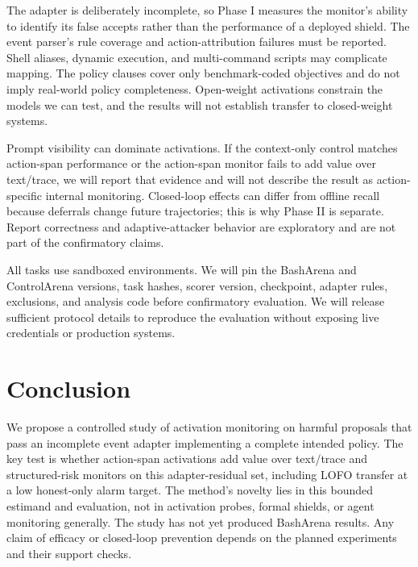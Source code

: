 \documentclass[11pt]{article}
\begin{document}
The adapter is deliberately incomplete, so Phase I measures the monitor's ability to identify its false accepts rather than the performance of a deployed shield. The event parser's rule coverage and action-attribution failures must be reported. Shell aliases, dynamic execution, and multi-command scripts may complicate mapping. The policy clauses cover only benchmark-coded objectives and do not imply real-world policy completeness. Open-weight activations constrain the models we can test, and the results will not establish transfer to closed-weight systems.

Prompt visibility can dominate activations. If the context-only control matches action-span performance or the action-span monitor fails to add value over text/trace, we will report that evidence and will not describe the result as action-specific internal monitoring. Closed-loop effects can differ from offline recall because deferrals change future trajectories; this is why Phase II is separate. Report correctness and adaptive-attacker behavior are exploratory and are not part of the confirmatory claims.

All tasks use sandboxed environments. We will pin the BashArena and ControlArena versions, task hashes, scorer version, checkpoint, adapter rules, exclusions, and analysis code before confirmatory evaluation. We will release sufficient protocol details to reproduce the evaluation without exposing live credentials or production systems.

\section{Conclusion}

We propose a controlled study of activation monitoring on harmful proposals that pass an incomplete event adapter implementing a complete intended policy. The key test is whether action-span activations add value over text/trace and structured-risk monitors on this adapter-residual set, including LOFO transfer at a low honest-only alarm target. The method's novelty lies in this bounded estimand and evaluation, not in activation probes, formal shields, or agent monitoring generally. The study has not yet produced BashArena results. Any claim of efficacy or closed-loop prevention depends on the planned experiments and their support checks.
\end{document}
